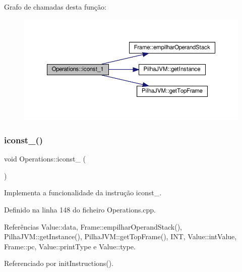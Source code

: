 Grafo de chamadas desta função\+:
\nopagebreak
\begin{figure}[H]
\begin{center}
\leavevmode
\includegraphics[width=350pt]{classOperations_a3933ba76ead633a53683ff8491a313ea_cgraph}
\end{center}
\end{figure}
\mbox{\label{classOperations_af1a4f99f0d99da0a7db7fc926932a3c8}} 
\subsubsection{\texorpdfstring{iconst\+\_()}{iconst\_2()}}
{\footnotesize\ttfamily void Operations\+::iconst\+\_ (\begin{DoxyParamCaption}{ }\end{DoxyParamCaption})\hspace{0.3cm}{\ttfamily [private]}}



Implementa a funcionalidade da instrução iconst\+\_. 



Definido na linha 148 do ficheiro Operations.\+cpp.



Referências Value\+::data, Frame\+::empilhar\+Operand\+Stack(), Pilha\+J\+V\+M\+::get\+Instance(), Pilha\+J\+V\+M\+::get\+Top\+Frame(), I\+NT, Value\+::int\+Value, Frame\+::pc, Value\+::print\+Type e Value\+::type.



Referenciado por init\+Instructions().

